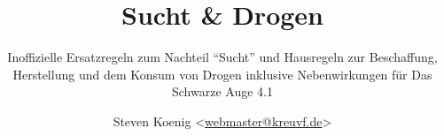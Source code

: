 

\title{Sucht \& Drogen}
\subtitle{Inoffizielle Ersatzregeln zum Nachteil \enquote{Sucht} und Hausregeln zur Beschaffung, Herstellung und dem Konsum von Drogen inklusive Nebenwirkungen für Das Schwarze Auge 4.1}
\author{Steven Koenig <\href{mailto:webmaster@kreuvf.de}{webmaster@kreuvf.de}>}
\date{\gitAuthorDate{}}
\maketitle
